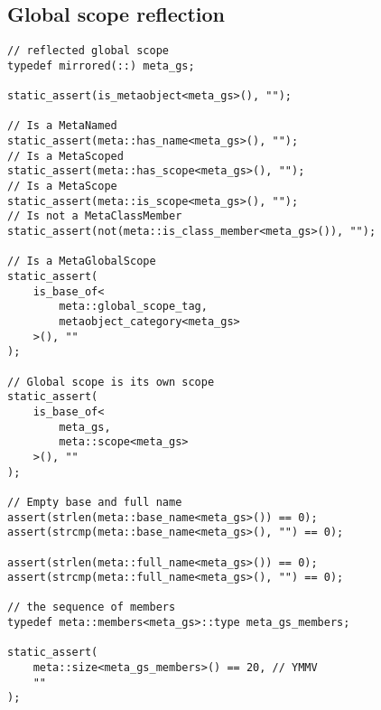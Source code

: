
\subsection{Global scope reflection}

\begin{verbatim}
// reflected global scope
typedef mirrored(::) meta_gs;

static_assert(is_metaobject<meta_gs>(), "");

// Is a MetaNamed
static_assert(meta::has_name<meta_gs>(), "");
// Is a MetaScoped
static_assert(meta::has_scope<meta_gs>(), "");
// Is a MetaScope
static_assert(meta::is_scope<meta_gs>(), "");
// Is not a MetaClassMember
static_assert(not(meta::is_class_member<meta_gs>()), "");

// Is a MetaGlobalScope
static_assert(
	is_base_of<
		meta::global_scope_tag,
		metaobject_category<meta_gs>
	>(), ""
);

// Global scope is its own scope
static_assert(
	is_base_of<
		meta_gs,
		meta::scope<meta_gs>
	>(), ""
);

// Empty base and full name
assert(strlen(meta::base_name<meta_gs>()) == 0);
assert(strcmp(meta::base_name<meta_gs>(), "") == 0);

assert(strlen(meta::full_name<meta_gs>()) == 0);
assert(strcmp(meta::full_name<meta_gs>(), "") == 0);

// the sequence of members
typedef meta::members<meta_gs>::type meta_gs_members;

static_assert(
	meta::size<meta_gs_members>() == 20, // YMMV
	""
);

\end{verbatim}

